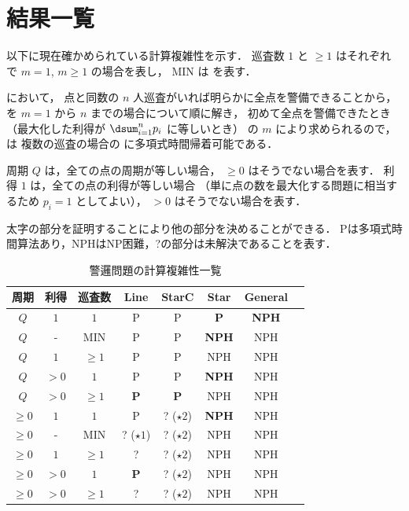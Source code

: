 

\section{結果一覧}
以下に現在確かめられている計算複雑性を示す．
巡査数 $1$ と $\geq 1$ はそれぞれ \maxprofit で $m = 1$, $m \geq 1$ の場合を表し，
MIN は \minpatroller を表す．

\minpatroller において，
点と同数の $n$ 人巡査がいれば明らかに全点を警備できることから，
\maxprofit を $m = 1$ から $n$ までの場合について順に解き，
初めて全点を警備できたとき（最大化した利得が $\dsum_{i = 1}^n p_i$ に等しいとき）
の $m$ により求められるので，\minpatroller は
複数の巡査の場合の \maxprofit に多項式時間帰着可能である．

周期 $Q$ は，全ての点の周期が等しい場合， $\geq 0$ はそうでない場合を表す．
利得 $1$ は，全ての点の利得が等しい場合
（単に点の数を最大化する問題に相当するため $p_i = 1$ としてよい），
$> 0$ はそうでない場合を表す．


太字の部分を証明することにより他の部分を決めることができる．
Pは多項式時間算法あり，NPHはNP困難，?の部分は未解決であることを表す．

\begin{table}[htbp]
	\centering
	\caption{警邏問題の計算複雑性一覧\label{tab:Patrol}}
	\begin{tabular}{|c|c|c||c|c|c|c|c|}
	\hline 周期 & 利得 & 巡査数 & Line & StarC & Star & General \\
	\hline $Q$      & $1$   & $1$      & P             & P             & {\bf P }  & {\bf NPH} \\
	\hline $Q$      & -     & MIN      & P             & P             & {\bf NPH} & NPH \\
	\hline $Q$      & $1$   & $\geq 1$ & P             & P             & NPH       & NPH \\
	\hline $Q$      & $> 0$ & $1$      & P             & P             & {\bf NPH} & NPH \\
	\hline $Q$      & $> 0$ & $\geq 1$ & {\bf P}       & {\bf P}       & NPH       & NPH \\
	\hline $\geq 0$ & $1$   & $1$      & P             & ? ($\star 2$) & {\bf NPH} & NPH \\
	\hline $\geq 0$ & -     & MIN      & ? ($\star 1$) & ? ($\star 2$) & NPH       & NPH \\
	\hline $\geq 0$ & $1$   & $\geq 1$ & ?             & ? ($\star 2$) & NPH       & NPH \\
	\hline $\geq 0$ & $> 0$ & $1$      & {\bf P}       & ? ($\star 2$) & NPH       & NPH \\
	\hline $\geq 0$ & $> 0$ & $\geq 1$ & ?             & ? ($\star 2$) & NPH       & NPH \\
	\hline
	\end{tabular}
\end{table}


